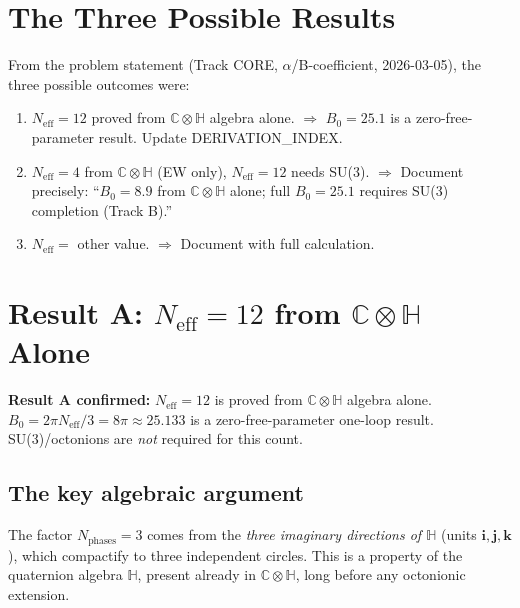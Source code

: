 \documentclass[12pt,a4paper]{article}
\theoremstyle{definition}
\theoremstyle{remark}
\newcommand{\C}{\mathbb{C}}
\renewcommand{\H}{\mathbb{H}}
\newcommand{\Neff}{N_{\mathrm{eff}}}
\begin{document}
\section{The Three Possible Results}
\label{sec:results}

From the problem statement (Track CORE, $\alpha$/B-coefficient, 2026-03-05),
the three possible outcomes were:

\begin{enumerate}
  \item[\textbf{A.}] $\Neff = 12$ proved from $\C \otimes \H$ algebra alone.
    $\Rightarrow$ $B_0 = 25.1$ is a zero-free-parameter result.
    Update DERIVATION\_INDEX.
  \item[\textbf{B.}] $\Neff = 4$ from $\C \otimes \H$ (EW only),
    $\Neff = 12$ needs SU(3).
    $\Rightarrow$ Document precisely: ``$B_0 = 8.9$ from $\C \otimes \H$ alone;
    full $B_0 = 25.1$ requires SU(3) completion (Track B).''
  \item[\textbf{C.}] $\Neff = $ other value.
    $\Rightarrow$ Document with full calculation.
\end{enumerate}

\section{Result A: $\Neff = 12$ from $\C \otimes \H$ Alone}
\label{sec:result_A}

\begin{center}
  \colorbox{provengreen!15}{%
    \parbox{0.88\textwidth}{%
      \large\textbf{Result A confirmed:}
      $\Neff = 12$ is proved from $\C \otimes \H$ algebra alone.\\[4pt]
      $B_0 = 2\pi\Neff/3 = 8\pi \approx 25.133$ is a zero-free-parameter
      one-loop result.\\[4pt]
      SU(3)/octonions are \emph{not} required for this count.}}
\end{center}

\subsection{The key algebraic argument}

The factor $N_\mathrm{phases} = 3$ comes from the \emph{three imaginary
directions of $\H$} (units $\mathbf{i}, \mathbf{j}, \mathbf{k}$), which
compactify to three independent circles.  This is a property of the
quaternion algebra $\H$, present already in $\C \otimes \H$, long before
any octonionic extension.
\end{document}
